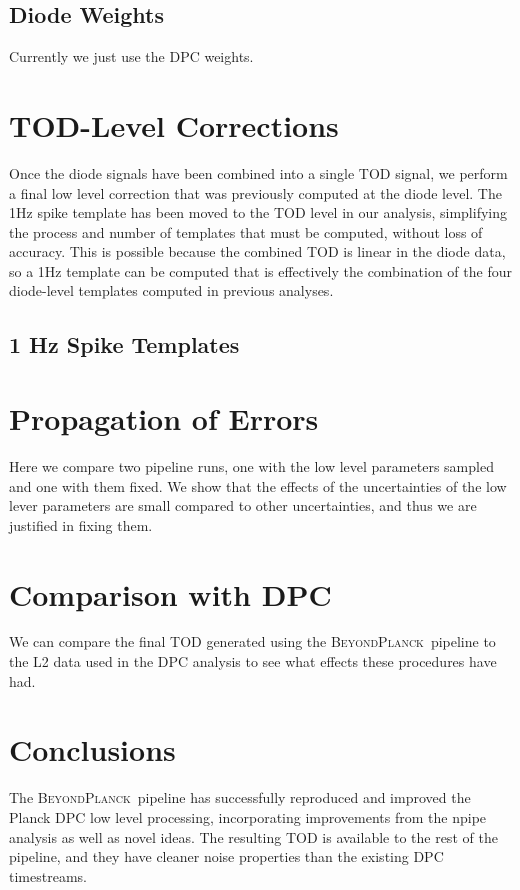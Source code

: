 \documentclass[twocolumn]{aa}
\newcommand{\BP}{\textsc{BeyondPlanck}}
\begin{document}
\subsection{Diode Weights}
\label{sec:weights}

Currently we just use the DPC weights. 

\section{TOD-Level Corrections}

Once the diode signals have been combined into a single TOD signal, we perform a final low level correction that was previously computed at the diode level. The 1Hz spike template has been moved to the TOD level in our analysis, simplifying the process and number of templates that must be computed, without loss of accuracy. This is possible because the combined TOD is linear in the diode data, so a 1Hz template can be computed that is effectively the combination of the four diode-level templates computed in previous analyses. 


\subsection{1 Hz Spike Templates}
\label{sec:1Hz}

\section{Propagation of Errors}
\label{sec:uncertainties}

Here we compare two pipeline runs, one with the low level parameters sampled and one with them fixed. We show that the effects of the uncertainties of the low lever parameters are small compared to other uncertainties, and thus we are justified in fixing them.

\section{Comparison with DPC}
\label{sec:comparison}

We can compare the final TOD generated using the \BP\ pipeline to the L2 data used in the DPC analysis to see what effects these procedures have had.

\section{Conclusions}
\label{sec:conclusions}

The \BP\ pipeline has successfully reproduced and improved the Planck DPC low level processing, incorporating improvements from the npipe analysis as well as novel ideas. The resulting TOD is available to the rest of the pipeline, and they have cleaner noise properties than the existing DPC timestreams. 






\end{document}
